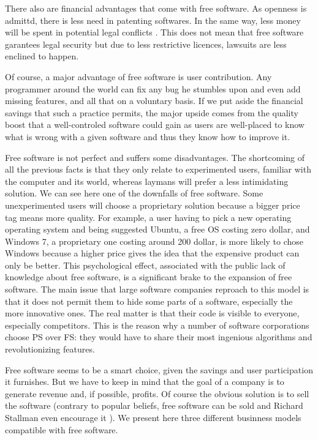 \documentclass[12pt]{article}
\begin{document}
There also are financial advantages that come with free software. As
openness is admittd, there is less need in patenting softwares.  In
the same way, less money will be spent in potential legal conflicts
\cite{afses}. This does not mean that free software garantees legal
security but due to less restrictive licences, lawsuits are less
enclined to happen.

Of course, a major advantage of free software is user
contribution. Any programmer around the world can fix any bug he
stumbles upon and even add missing features, and all that on a
voluntary basis. If we put aside the financial savings that such a
practice permits, the major upside comes from the quality boost that a
well-controled software could gain as users are well-placed to know
what is wrong with a given software and thus they know how to improve
it.

Free software is not perfect and suffers some disadvantages. The
shortcoming of all the previous facts is that they only relate to
experimented users, familiar with the computer and its world, whereas
laymans will prefer a less intimidating solution. We can see here one
of the downfalls of free software. Some unexperimented users will
choose a proprietary solution because a bigger price tag means more
quality.  For example, a user having to pick a new operating operating
system and being suggested Ubuntu, a free OS costing zero dollar, and
Windows 7, a proprietary one costing around 200 dollar, is more likely
to chose Windows because a higher price gives the idea that the
expensive product can only be better.  This psychological effect,
associated with the public lack of knowledge about free software, is a
significant brake to the expansion of free software. The main issue
that large software companies reproach to this model is that it does
not permit them to hide some parts of a software, especially the more
innovative ones. The real matter is that their code is visible to
everyone, especially competitors. This is the reason why a number of
software corporations choose PS over FS: they would have to share
their most ingenious algorithms and revolutionizing features.

Free software seems to be a smart choice, given the savings and user
participation it furnishes. But we have to keep in mind that the goal
of a company is to generate revenue and, if possible, profits. Of
course the obvious solution is to sell the software (contrary to
popular beliefs, free software can be sold and Richard Stallman even
encourage it \cite{sell}). We present here three different businness
models compatible with free software.
\end{document}

